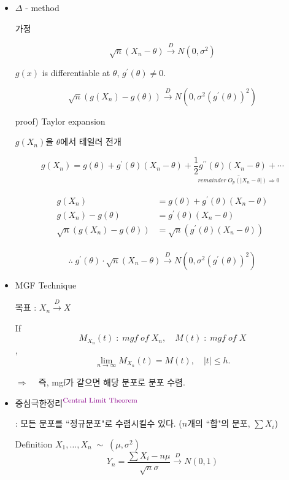 \documentclass{oblivoir}
\newcommand{\DC}[1]{\textcolor{DarkMagenta}{#1}}%
\newcommand{\UP}[1]{$^{\mbox{\DC{\footnotesize #1}}}$}
\begin{document}
\begin{itemize}
\item
$\Delta$ - method

가정

$$
\sqrt{n} (X_n - \theta) \overset{D}{\longrightarrow} N(0, \sigma^2)
$$

$g(x)$ is differentiable at $\theta$, $g^{\prime} (\theta) \ne 0$.

$$
\sqrt{n} (g(X_n) - g(\theta)) \overset{D}{\longrightarrow} N(0,\sigma^2 (g^{\prime}(\theta))^2)
$$

proof) Taylor expansion

$g(X_n)$을 $\theta$에서 테일러 전개

$$
g(X_n) = g(\theta) + g^{\prime}(\theta) (X_n - \theta) + \underset{remainder \; O_p (|X_n - \theta|) \Rightarrow 0}{ \underline{ \frac{1}{2} g^{\prime\prime}(\theta)(X_n - \theta) + \cdots } }
$$
\begin{myframe}{}
\begin{align*}
g(X_n) &= g(\theta) + g^{\prime}(\theta) (X_n - \theta) \\
g(X_n) - g(\theta) &=  g^{\prime}(\theta) (X_n - \theta) \\
\sqrt{n} (g(X_n) - g(\theta)) &=  \sqrt{n} (g^{\prime}(\theta) (X_n - \theta)) \\
\end{align*}
\end{myframe}
$$
\therefore \; g^{\prime} (\theta) \cdot \sqrt{n} (X_n - \theta) \overset{D}{\longrightarrow} N(0, \sigma^2 (g^{\prime}(\theta))^2)
$$

\item 
MGF Technique

목표 : $X_n \overset{D}{\longrightarrow} X$

If 
$$
M_{X_n}(t) \; : \; mgf \; of \; X_n, \quad M(t) \; : \; mgf \; of \; X
$$,
$$
\lim_{n\rightarrow \infty} M_{X_n} (t) = M(t), \quad |t| \leq h.
$$

$\Rightarrow$ ~ 즉, mgf가 같으면 해당 분포로 분포 수렴.

\item
중심극한정리\UP{Central Limit Theorem}

: 모든 분포를 ``정규분포"로 수렴시킬수 있다. ($n$개의 ``합"의 분포, $\sum X_i$)

\begin{myframe}{Definition}
$X_1, \ldots, X_n \; \sim \; (\mu, \sigma^2)$
$$
Y_n = \frac{\sum X_i - n \mu}{\sqrt{n} \sigma} \overset{D}{\longrightarrow} N(0,1)
$$


\end{myframe}
\end{itemize}
\end{document}
